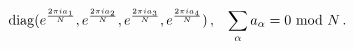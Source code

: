 \begin{equation}
{\rm diag}(e^{2 \pi i a_1 \over N},e^{2 \pi i a_2 \over N},
e^{2 \pi i a_3 \over N},e^{2 \pi i a_4 \over N}) \, , 
\,\,\,\,\, \sum_\alpha a_\alpha = 0\,\, {\rm mod}\,\, N \, .
\end{equation}

